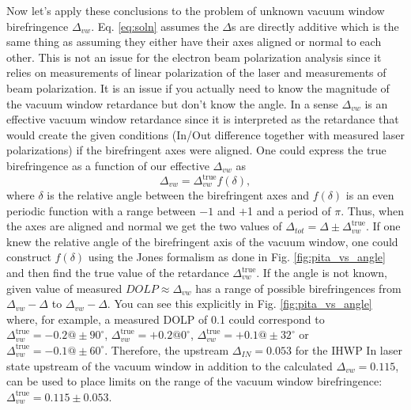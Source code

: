 \documentclass[12pt]{article}
\begin{document}
Now let's apply these conclusions to the problem of unknown vacuum window birefringence $\Delta_{vw}$. Eq. \ref{eq:soln} assumes the $\Delta$s are directly additive which is the same thing as assuming they either have their axes aligned or normal to each other. This is not an issue for the electron beam polarization analysis since it relies on measurements of linear polarization of the laser and measurements of beam polarization. It is an issue if you actually need to know the magnitude of the vacuum window retardance but don't know the angle. In a sense $\Delta_{vw}$ is an effective vacuum window retardance since it is interpreted as the retardance that would create the given conditions (In/Out difference together with measured laser polarizations) if the birefringent axes were aligned. One could express the true birefringence as a function of our effective $\Delta_{vw}$ as 
\[
\Delta_{vw}=\Delta^{\textrm{true}}_{vw}f(\delta),
\]
where $\delta$ is the relative angle between the birefringent axes and $f(\delta)$ is an even periodic function with a range between $-1$ and $+$1 and a period of $\pi$. Thus, when the axes are aligned and normal we get the two values of $\Delta_{tot}=\Delta\pm\Delta^{\textrm{true}}_{vw}$.  If one knew the relative angle of the birefringent axis of the vacuum window, one could construct $f(\delta)$ using the Jones formalism as done in Fig. \ref{fig:pita_vs_angle} and then find the true value of the retardance $\Delta^{\textrm{true}}_{vw}$. If the angle is not known, given value of measured $DOLP\approx\Delta_{vw}$ has a range of possible birefringences from $\Delta_{vw}-\Delta$ to $\Delta_{vw}-\Delta$. You can see this explicitly in Fig. \ref{fig:pita_vs_angle} where, for example, a measured DOLP of 0.1 could correspond to $\Delta^{\textrm{true}}_{vw}=-0.2@\pm90^{\circ}$, $\Delta^{\textrm{true}}_{vw}=+0.2@0^{\circ}$, $\Delta^{\textrm{true}}_{vw}=+0.1@\pm32^{\circ}$ or $\Delta^{\textrm{true}}_{vw}=-0.1@\pm60^{\circ}$. Therefore, the upstream $\Delta_{IN}=0.053$ for the IHWP In laser state upstream of the vacuum window in addition to the calculated $\Delta_{vw}=0.115$, can be used to place limits on the range of the vacuum window birefringence: $\Delta^{\textrm{true}}_{vw}=0.115\pm0.053$. 
\newpage

%


\end{document}
